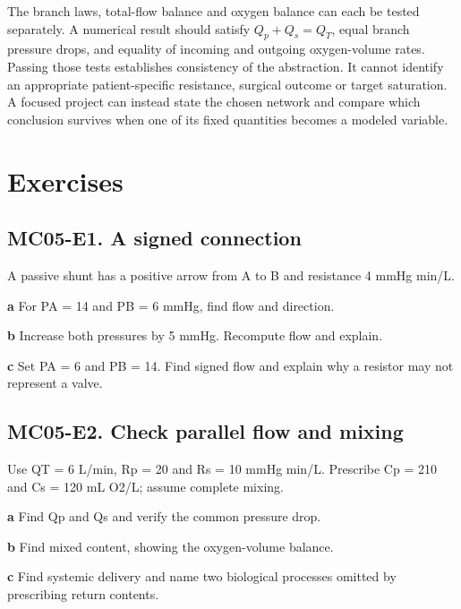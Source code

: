 \documentclass[11pt,letterpaper]{article}
\theoremstyle{definition}\newtheorem{definition}{Definition}\newtheorem{example}{Example}
\numberwithin{equation}{section}
\begin{document}
The branch laws, total-flow balance and oxygen balance can each be tested separately. A numerical result should satisfy $Q_p+Q_s=Q_T$, equal branch pressure drops, and equality of incoming and outgoing oxygen-volume rates. Passing those tests establishes consistency of the abstraction. It cannot identify an appropriate patient-specific resistance, surgical outcome or target saturation. A focused project can instead state the chosen network and compare which conclusion survives when one of its fixed quantities becomes a modeled variable.
\bigskip
\section*{Exercises}
\par\noindent\begin{minipage}{\linewidth}
\subsection*{MC05-E1. A signed connection}
A passive shunt has a positive arrow from A to B and resistance 4 mmHg min/L.

\textbf{a} For PA =\allowbreak{} 14 and PB =\allowbreak{} 6 mmHg, find flow and direction.

\end{minipage}\par\medskip
\textbf{b} Increase both pressures by 5 mmHg. Recompute flow and explain.

\textbf{c} Set PA =\allowbreak{} 6 and PB =\allowbreak{} 14. Find signed flow and explain why a resistor may not represent a valve.

\par\noindent\begin{minipage}{\linewidth}
\subsection*{MC05-E2. Check parallel flow and mixing}
Use QT =\allowbreak{} 6 L/min, Rp =\allowbreak{} 20 and Rs =\allowbreak{} 10 mmHg min/L. Prescribe Cp =\allowbreak{} 210 and Cs =\allowbreak{} 120 mL O2/L; assume complete mixing.

\textbf{a} Find Qp and Qs and verify the common pressure drop.

\end{minipage}\par\medskip
\textbf{b} Find mixed content, showing the oxygen-volume balance.

\textbf{c} Find systemic delivery and name two biological processes omitted by prescribing return contents.
\end{document}
